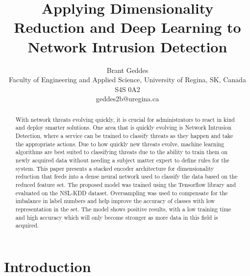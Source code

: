 \documentclass{article}
\title{Applying Dimensionality Reduction and Deep Learning to Network Intrusion Detection}
\author{
  Brant Geddes\\
  Faculty of Engineering and Applied Science, University of Regina, SK, Canada S4S 0A2\\
  geddes2b@uregina.ca
}
\begin{document}
\maketitle

\begin{abstract}
  With network threats evolving quickly, it is crucial for administrators to react in kind and deploy smarter solutions. One area that is quickly evolving is Network Intrusion Detection, where a service can be trained to classify threats as they happen and take the appropriate actions. Due to how quickly new threats evolve, machine learning algorithms are best suited to classifying threats due to the ability to train them on newly acquired data without needing a subject matter expert to define rules for the system. This paper presents a stacked encoder architecture for dimensionality reduction that feeds into a dense neural network used to classify the data based on the reduced feature set. The proposed model was trained using the Tensorflow library and evaluated on the NSL-KDD dataset. Oversampling was used to compensate for the imbalance in label numbers and help improve the accuracy of classes with low representation in the set. The model shows positive results, with a low training time and high accuracy which will only become stronger as more data in this field is acquired.
\end{abstract}

\section{Introduction}
\end{document}
